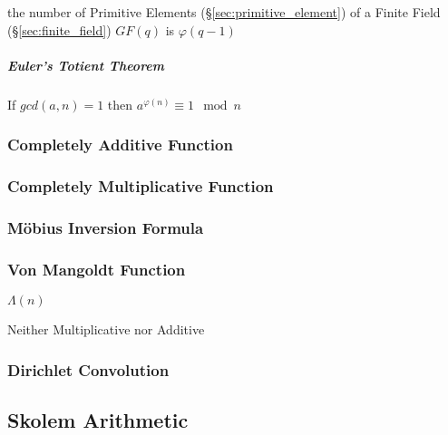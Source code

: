 the number of Primitive Elements (\S\ref{sec:primitive_element}) of a Finite
Field (\S\ref{sec:finite_field}) $GF(q)$ is $\varphi(q - 1)$



\subparagraph{Euler's Totient Theorem}\label{sec:totient_theorem}\hfill

If $gcd(a,n) = 1$ then $a^{\varphi(n)} \equiv 1 \mod n$



\subsubsection{Completely Additive Function}
\label{sec:completely_additive_function}

\subsubsection{Completely Multiplicative Function}
\label{sec:completely_multiplicative_function}

\subsubsection{M\"obius Inversion Formula}
\label{sec:mobius_inversion}

\subsubsection{Von Mangoldt Function}\label{sec:vonmangoldt_function}

$\Lambda(n)$

Neither Multiplicative nor Additive



\subsubsection{Dirichlet Convolution}\label{sec:dirichlet_convolution}



\subsection{Skolem Arithmetic}\label{sec:skolem_arithmetic}
\cite{skolem23}

